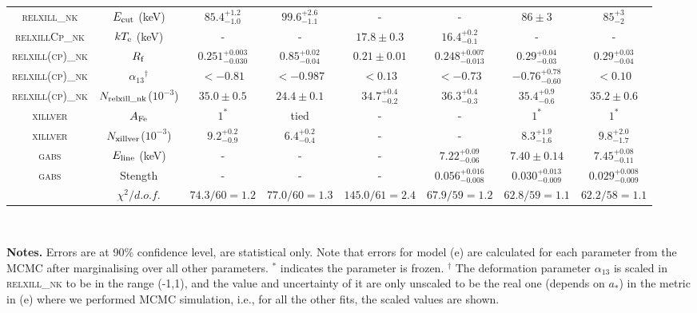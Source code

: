 \documentclass[11pt,a4paper,pdftex]{article}
\begin{document}
\begin{table*}
\begin{center}
{{\begin{tabular}{cc|cc|cc|cc}
\textsc{relxill\_nk}&$E_{\rm cut}$ (keV)& $85.4^{+1.2}_{-1.0}$ & $99.6^{+2.6}_{-1.1}$ & - & - & $86\pm3$ & $85^{+3}_{-2}$ \\
\textsc{relxillCp\_nk}&$kT_{\rm e}$ (keV)& - & - & $17.8\pm0.3$ & $16.4^{+0.2}_{-0.1}$ & - & - \\
\textsc{relxill(cp)\_nk}&$R_{\rm f}$& $0.251^{+0.003}_{-0.030}$ & $0.85^{+0.02}_{-0.04}$ & $0.21\pm0.01$ & $0.248^{+0.007}_{-0.013}$ & $0.29^{+0.04}_{-0.03}$ & $0.29^{+0.03}_{-0.04}$ \\
\textsc{relxill(cp)\_nk}&$\alpha_{13}$$^\dagger$ & $<-0.81$ & $<-0.987$ & $<0.13$ & $<-0.73$ & $-0.76^{+0.78}_{-0.60}$  & $<0.10$  \\
\textsc{relxill(cp)\_nk}&$N_{\rm relxill\_nk}$($10^{-3}$)& $35.0\pm0.5$ & $24.4\pm0.1$ & $34.7^{+0.4}_{-0.2}$ & $36.3^{+0.4}_{-0.3}$ & $35.4^{+0.9}_{-0.6}$ & $35.2\pm0.6$ \\
\textsc{xillver}&$A_{\rm Fe}$& $1^*$ & tied & - & - & $1^*$ & $1^*$ \\
\textsc{xillver}&$N_{\rm xillver}$($10^{-3}$)& $9.2^{+0.2}_{-0.9}$ & $6.4^{+0.2}_{-0.4}$ & - & - & $8.3^{+1.9}_{-1.6}$ & $9.8^{+2.0}_{-1.7}$ \\
\textsc{gabs}&$E_{\rm line}$ (keV)& - & - & - & $7.22^{+0.09}_{-0.06}$ & $7.40\pm0.14$ & $7.45^{+0.08}_{-0.11}$ \\
\textsc{gabs}&Stength& - & - & - & $0.056^{+0.016}_{-0.008}$ & $0.030^{+0.013}_{-0.009}$ & $0.029^{+0.008}_{-0.009}$ \\
\hline
&$\chi^2/d.o.f.$& $74.3/60=1.2$ & $77.0/60=1.3$ & $145.0/61=2.4$ & $67.9/59=1.2$ & $62.8/59=1.1$ & $62.2/58=1.1$ \\
\hline
\end{tabular}}\\
\vspace{0.3cm}
}
\raggedright{
\textbf{Notes.} Errors are at 90\% confidence level, are statistical only. Note that errors for model (e) are calculated for each parameter from the MCMC after marginalising over all other parameters. $^*$ indicates the parameter is frozen. $^\dagger$ The deformation parameter $\alpha_{13}$ is scaled in \textsc{relxill\_nk} to be in the range (-1,1), and the value and uncertainty of it are only unscaled to be the real one (depends on $a_*$) in the metric in (e) where we performed MCMC simulation, i.e., for all the other fits, the scaled values are shown. }
\end{center}
\end{table*}
\end{document}
